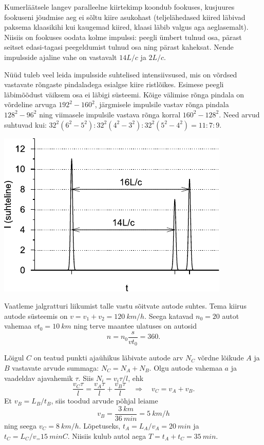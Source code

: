 \documentclass[10pt, twoside]{article}
\begin{document}
{Kumerläätsele langev paralleelne kiirtekimp koondub fookuses, kusjuures fookuseni jõudmise aeg ei sõltu kiire asukohast (teljelähedased kiired läbivad paksema klaasikihi kui kaugemad kiired, klaasi läbib valgus aga aeglasemalt). Niisiis on fookuses oodata kolme impulssi: peegli ümbert tulnud osa, pärast seitset edasi-tagasi peegeldumist tulnud osa ning pärast kaheksat. Nende impulsside ajaline vahe on vastavalt $14L/c$ ja $2L/c$.

Nüüd tuleb veel leida impulsside suhtelised intensiivsused, mis on võrdsed vastavate rõngaste pindaladega esialgse kiire ristlõikes. Esimese peegli läbimõõdust väiksem osa ei läbigi süsteemi. Kõige välimise rõnga pindala on võrdeline arvuga $192^2 - 160^2$, järgmisele impulsile vastav rõnga pindala $128^2 - 96^2$ ning viimasele impulsile vastava rõnga korral $160^2 - 128^2$. Need arvud suhtuvad kui: $32^2(6^2 - 5^2) : 32^2 (4^2 - 3^2) : 32^2 (5^2 - 4^2) = 11 : 7 : 9$.

\begin{center}
	\includegraphics[width=0.6\linewidth]{2006-v3g-09-lah}
\end{center}
\probend
\bigskip


\solu
Vaatleme jalgratturi liikumist talle vastu sõitvate autode suhtes. Tema kiirus autode süsteemis on $v = v_1 + v_2 = \SI{120}{km/h}$. Seega katavad $n_0 = 20$ autot vahemaa $vt_0 = \SI{10}{km}$ ning terve maantee ulatuses on autosid
\[
n = n_0 \frac{s}{vt_0} = \num{360}. 
\]
\probend
\bigskip


\solu
Lõigul $C$ on teatud punkti ajaühikus läbivate autode arv $N_C$ võrdne lõikude $A$ ja $B$ vastavate arvude summaga: $N_C = N_A + N_B$. Olgu autode vahemaa $a$ ja vaadeldav ajavahemik $\tau$. Siis $N_i = v_i\tau /l$, ehk 
\[
\frac{v_{C} \tau}{l}=\frac{v_{A} \tau}{l}+\frac{v_{B} \tau}{l} \quad \Rightarrow \quad v_{C}=v_{A}+v_{B}.
\]
Et $v_B = L_B/t_B$, siis toodud arvude põhjal leiame 
\[
v_{B}=\frac{\SI{3}{km}}{\SI{36}{min}}=\SI{5}{km/h}
\]
ning seega $v_C = \SI{8}{km/h}$. Lõpetuseks, $t_A = L_A/v_A=\SI{20}{min}$ ja $t_C = L_C/v_ = \SI{15}{min}C$. Niisiis kulub autol aega $T = t_A + t_C = \SI{35}{min}$.
\probend
\bigskip

}
\end{document}
